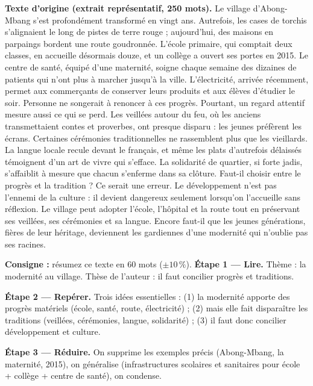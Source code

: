 \documentclass[11pt]{article}
\begin{document}
\begin{exoresolu}
\textbf{Texte d'origine (extrait représentatif, 250 mots).} \og Le village d'Abong-Mbang s'est profondément transformé en vingt ans. Autrefois, les cases de torchis s'alignaient le long de pistes de terre rouge ; aujourd'hui, des maisons en parpaings bordent une route goudronnée. L'école primaire, qui comptait deux classes, en accueille désormais douze, et un collège a ouvert ses portes en 2015. Le centre de santé, équipé d'une maternité, soigne chaque semaine des dizaines de patients qui n'ont plus à marcher jusqu'à la ville. L'électricité, arrivée récemment, permet aux commerçants de conserver leurs produits et aux élèves d'étudier le soir. Personne ne songerait à renoncer à ces progrès. Pourtant, un regard attentif mesure aussi ce qui se perd. Les veillées autour du feu, où les anciens transmettaient contes et proverbes, ont presque disparu : les jeunes préfèrent les écrans. Certaines cérémonies traditionnelles ne rassemblent plus que les vieillards. La langue locale recule devant le français, et même les plats d'autrefois délaissés témoignent d'un art de vivre qui s'efface. La solidarité de quartier, si forte jadis, s'affaiblit à mesure que chacun s'enferme dans sa clôture. Faut-il choisir entre le progrès et la tradition ? Ce serait une erreur. Le développement n'est pas l'ennemi de la culture : il devient dangereux seulement lorsqu'on l'accueille sans réflexion. Le village peut adopter l'école, l'hôpital et la route tout en préservant ses veillées, ses cérémonies et sa langue. Encore faut-il que les jeunes générations, fières de leur héritage, deviennent les gardiennes d'une modernité qui n'oublie pas ses racines. \fg{}

\textbf{Consigne :} résumez ce texte en 60 mots ($\pm 10\,\%$).
\tcblower
\textbf{Étape 1 — Lire.} Thème : la modernité au village. Thèse de l'auteur : il faut concilier progrès et traditions.

\textbf{Étape 2 — Repérer.} Trois idées essentielles : (1) la modernité apporte des progrès matériels (école, santé, route, électricité) ; (2) mais elle fait disparaître les traditions (veillées, cérémonies, langue, solidarité) ; (3) il faut donc concilier développement et culture.

\textbf{Étape 3 — Réduire.} On supprime les exemples précis (Abong-Mbang, la maternité, 2015), on généralise (\og infrastructures scolaires et sanitaires \fg{} pour école + collège + centre de santé), on condense.


\end{exoresolu}
\end{document}
